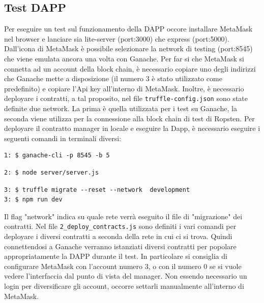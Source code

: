 \subsection{Test DAPP}
Per eseguire un test sul funzionamento della DAPP occore installare MetaMask nel browser e lanciare sia lite-server (port:3000) che express (port:5000). Dall'icona di MetaMask è possibile selezionare la network di testing (port:8545) che viene emulata ancora una volta con Ganache. Per far si che MetaMask si connetta ad un account della block chain, è necessario copiare uno degli indirizzi che Ganache mette a disposizione (il numero 3 è stato utilizzato come predefinito) e copiare l'Api key all'interno di MetaMask. Inoltre, è necessario deployare i contratti, a tal proposito, nel file \texttt{truffle-config.json} sono state definite due network. La prima è quella utilizzata per i test su Ganache, la seconda viene utilizza per la connessione alla block chain di test di Ropsten. Per deployare il contratto manager in locale e eseguire la Dapp, è necessario eseguire i seguenti comandi in terminali diversi:
\begin{verbatim}
1: $ ganache-cli -p 8545 -b 5
\end{verbatim}
\begin{verbatim}
2: $ node server/server.js
\end{verbatim}
\begin{verbatim}
3: $ truffle migrate --reset --network  development
3: $ npm run dev
\end{verbatim}
Il flag "network" indica su quale rete verrà eseguito il file di "migrazione" dei contratti. Nel file \texttt{2\_deploy\_contracts.js} sono definiti i vari comandi per deployare i diversi contratti a seconda della rete in cui ci si trova. Quindi connettendosi a Ganache verranno istanziati diversi contratti per popolare appropriatamente la DAPP durante il test. In particolare si consiglia di configurare MetaMask con l'account numero 3, o con il numero 0 se si vuole vedere l'interfaccia dal punto di vista del manager. Non essendo necessario un login per diversificare gli account, occorre settarli manualmente all'interno di MetaMask.
